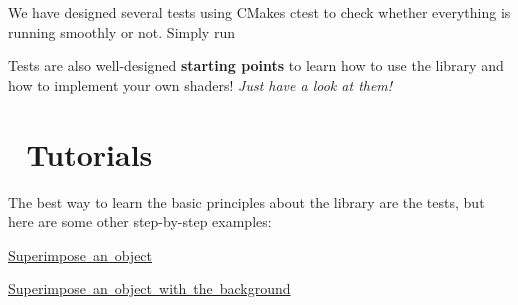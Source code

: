  We have designed several tests using {\ttfamily C\+Make}\textquotesingle{}s {\ttfamily ctest} to check whether everything is running smoothly or not. Simply run 


Tests are also well-\/designed {\bfseries starting points} to learn how to use the library and how to implement your own shaders! {\itshape Just have a look at them!}\hypertarget{index_tutorials}{}\section{📘 Tutorials}\label{index_tutorials}


 The best way to learn the basic principles about the library are the tests, but here are some other step-\/by-\/step examples\+:
\begin{DoxyItemize}
\item \mbox{\hyperlink{tutorial_superimpose}{Superimpose an object}}
\item \mbox{\hyperlink{tutorial_superimpose_background}{Superimpose an object with the background}} 
\end{DoxyItemize}